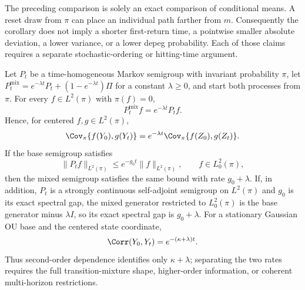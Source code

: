 \begin{remark}
The preceding comparison is solely an exact comparison of conditional means.
A reset draw from $\pi$ can place an individual path farther from $m$.
Consequently the corollary does not imply a shorter first-return time, a
pointwise smaller absolute deviation, a lower variance, or a lower depeg
probability.  Each of those claims requires a separate stochastic-ordering or
hitting-time argument.
\end{remark}

\begin{theorem}
\label{rev:thm-mixed-spectrum}
Let $P_t$ be a time-homogeneous Markov semigroup with invariant probability
$\pi$, let $P_t^{\mathrm{mix}}=e^{-\lambda t}P_t+
(1-e^{-\lambda t})\Pi$ for a constant $\lambda\geq0$, and start both processes
from $\pi$.  For every $f\in L^2(\pi)$ with $\pi(f)=0$,
\begin{equation}
 P_t^{\mathrm{mix}}f=e^{-\lambda t}P_tf.
 \label{rev:mixed-centered-semigroup}
\end{equation}
Hence, for centered $f,g\in L^2(\pi)$,
\begin{equation}
 \Cov_\pi\{f(Y_0),g(Y_t)\}
 =e^{-\lambda t}\Cov_\pi\{f(Z_0),g(Z_t)\}.
 \label{rev:mixed-centered-covariance}
\end{equation}
If the base semigroup satisfies
\begin{equation}
 \lVert P_tf\rVert_{L^2(\pi)}\leq e^{-g_0t}
 \lVert f\rVert_{L^2(\pi)},\qquad f\in L_0^2(\pi),
 \label{rev:base-L2-decay}
\end{equation}
then the mixed semigroup satisfies the same bound with rate $g_0+\lambda$.
If, in addition, $P_t$ is a strongly continuous self-adjoint semigroup on
$L^2(\pi)$ and $g_0$ is its exact spectral gap, the mixed generator restricted
to $L_0^2(\pi)$ is the base generator minus $\lambda I$, so its exact spectral
gap is $g_0+\lambda$.  For a stationary Gaussian OU base and the centered state
coordinate,
\begin{equation}
 \Corr(Y_0,Y_t)=e^{-(\kappa+\lambda)t}.
 \label{rev:mixed-OU-correlation}
\end{equation}
Thus second-order dependence identifies only $\kappa+\lambda$; separating the
two rates requires the full transition-mixture shape, higher-order
information, or coherent multi-horizon restrictions.
\end{theorem}

